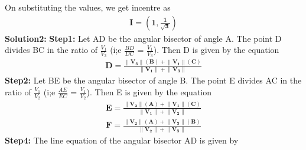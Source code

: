 \documentclass[10pt,a4paper]{report}
\providecommand{\norm}[1]{\left\lVert#1\right\rVert}
\let\vec\mathbf
\begin{document}
\begin{multicols}{2}
On substituting the values, we get incentre as
\newline	 
\begin{align}
\boxed{\vec{I=(1,\frac{1}{\sqrt{3}})}}
\end{align}
\textbf{Solution2:}
\newline
\textbf{Step1:} Let AD be the angular bisector of angle A. The point D divides BC in the ratio of $\frac{V_1}{V_3}$ (i;e $\frac{BD}{DC}$ = $\frac{V_1}{V_3}$). Then D is given by the equation
\begin{align}
 \vec{D = \frac{\norm{V_3}(B)+\norm{V_1}(C)}{\norm{V_1}+\norm{V_3}}}
\end{align}
\textbf{Step2:} Let BE be the angular bisector of angle B. The point E divides AC in the ratio of $\frac{V_1}{V_2}$ (i;e $\frac{AE}{EC}$ = $\frac{V_1}{V_2}$). Then E is given by the equation
\begin{align}
 \vec{E = \frac{\norm{V_2}(A)+\norm{V_1}(C)}{\norm{V_1}+\norm{V_2}}}
\end{align}
\begin{align}
 \vec{F = \frac{\norm{V_2}(A)+\norm{V_3}(B)}{\norm{V_2}+\norm{V_3}}}
\end{align}
\textbf{Step4:} The line equation of the angular bisector AD is given by

\end{multicols}
\end{document}
